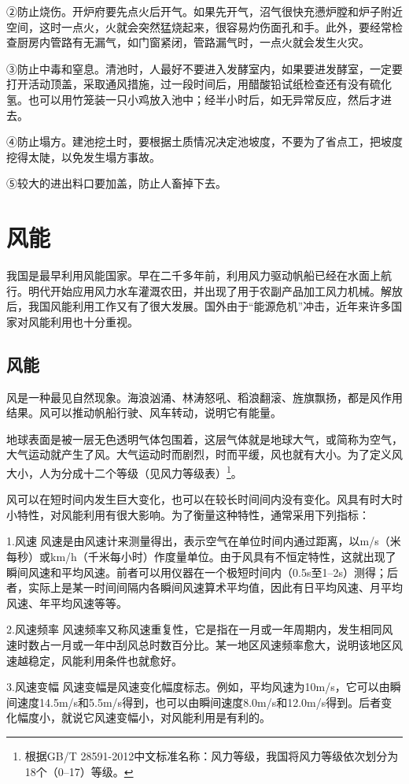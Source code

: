 \documentclass{ctexbook}
\begin{document}
②防止烧伤。开炉府要先点火后开气。如果先开气，沼气很快充懑炉膛和炉子附近空间，这时一点火，火就会突然猛烧起来，很容易灼伤面孔和手。此外，要经常检查厨房内管路有无漏气，如门窗紧闭，管路漏气时，一点火就会发生火灾。

③防止中毒和窒息。清池时，人最好不要进入发酵室内，如果要进发酵室，一定要打开活动顶盖，采取通风措施，过一段时间后，用醋酸铅试纸检查还有没有硫化氢。也可以用竹笼装一只小鸡放入池中；经半小时后，如无异常反应，然后才进去。

④防止塌方。建池挖土时，要根据土质情况决定池坡度，不要为了省点工，把坡度挖得太陡，以免发生塌方事故。

⑤较大的进出料口要加盖，防止人畜掉下去。
\section{风能}
我国是最早利用风能国家。早在二千多年前，利用风力驱动帆船已经在水面上航行。明代开始应用风力水车灌溉农田，并出现了用于农副产品加工风力机械。解放后，我国风能利用工作又有了很大发展。国外由于“能源危机”冲击，近年来许多国家对风能利用也十分重视。
\subsection{风能}
风是一种最见自然现象。海浪汹涌、林涛怒吼、稻浪翻滚、旌旗飘扬，都是风作用结果。风可以推动帆船行驶、风车转动，说明它有能量。

地球表面是被一层无色透明气体包围着，这层气体就是地球大气，或简称为空气，大气运动就产生了风。大气运动时而剧烈，时而平缓，风也就有大小。为了定义风大小，人为分成十二个等级（见风力等级表）\footnote{根据GB/T 28591-2012中文标准名称：风力等级，我国将风力等级依次划分为18个（0--17）等级。}。

风可以在短时间内发生巨大变化，也可以在较长时间间内没有变化。风具有时大时小特性，对风能利用有很大影响。为了衡量这种特性，通常采用下列指标：

1.风速 风速是由风速计来测量得出，表示空气在单位时间内通过距离，以m/s（米每秒）或km/h（千米每小时）作度量单位。由于风具有不恒定特性，这就出现了瞬间风速和平均风速。前者可以用仪器在一个极短时间内（0.5s至1--2s）测得；后者，实际上是某一时间间隔内各瞬间风速算术平均值，因此有日平均风速、月平均风速、年平均风速等等。

2.风速频率 风速频率又称风速重复性，它是指在一月或一年周期内，发生相同风速时数占一月或一年中刮风总时数百分比。某一地区风速频率愈大，说明该地区风速越稳定，风能利用条件也就愈好。

3.风速变幅 风速变幅是风速变化幅度标志。例如，平均风速为10m/s，它可以由瞬间速度14.5m/s和5.5m/s得到，也可以由瞬间速度8.0m/s和12.0m/s得到。后者变化幅度小，就说它风速变幅小，对风能利用是有利的。
\end{document}
